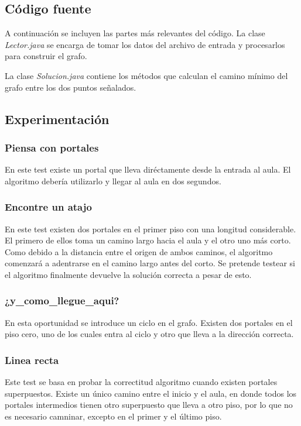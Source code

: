 \subsection{Código fuente}
A continuación se incluyen las partes más relevantes del código.
La clase \emph{Lector.java} se encarga de tomar los datos del archivo de entrada y procesarlos para construir el grafo.

La clase \emph{Solucion.java} contiene los métodos que calculan el camino mínimo del grafo entre los dos puntos señalados.


\subsection{Experimentación}

\subsubsection{Piensa con portales}
En este test existe un portal que lleva diréctamente desde la entrada al aula. El algoritmo debería utilizarlo y llegar al aula en dos segundos.

\subsubsection{Encontre un atajo}
En este test existen dos portales en el primer piso con una longitud considerable. El primero de ellos toma un camino largo hacia el aula y el otro uno más corto. Como debido a la distancia entre el origen de ambos caminos, el algoritmo comenzará a adentrarse en el camino largo antes del corto. Se pretende testear si el algoritmo finalmente devuelve la solución correcta a pesar de esto.

\subsubsection{¿y_como_llegue_aqui?}
En esta oportunidad se introduce un ciclo en el grafo. Existen dos portales en el piso cero, uno de los cuales entra al ciclo y otro que lleva a la dirección correcta.

\subsubsection{Linea recta}
Este test se basa en probar la correctitud algoritmo cuando existen portales superpuestos. Existe un único camino entre el inicio y el aula, en donde todos los portales intermedios tienen otro superpuesto que lleva a otro piso, por lo que no es necesario camninar, excepto en el primer y el último piso.

